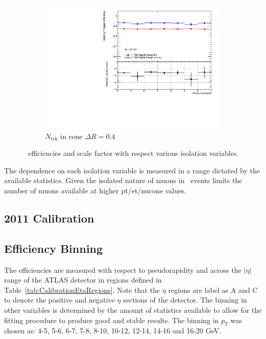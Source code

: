 \begin{figure}[phtb]
    \begin{subfigure}[b]{0.60\textwidth}
      \includegraphics[width=\textwidth]{PartCalibration2012/Plots/SFPlots/nucone40_smt.pdf}
      \caption{$N_{\textrm{trk}}$ in cone $\Delta R=0.4$} \label{fig:CalibrationIsoNucone40}
    \end{subfigure}
  \caption{\xsd\ efficiencies and scale factor with respect various isolation variables.} \label{fig:CalibrationIsoNucone}
\end{figure}

The dependence on each isolation variable is measured in a range dictated by the available statistics. Given the isolated nature of muons in \jpsi\ events limits the number of muons available at higher pt/et/nucone values.

\subsection{2011 Calibration}


\subsection{Efficiency Binning}

The efficiencies are measured with respect to pseudorapidity and across the $|\eta|$ range of the ATLAS detector in regions defined in Table~\ref{tab:CalibrationEtaRegions}. Note that the $\eta$ regions are label as A and C to denote the positive and negative $\eta$ sections of the detector. The binning in other variables is determined by the amount of statistics available to allow for the fitting procedure to produce good and stable results. The binning in $p_{T}$ was chosen as: 4-5, 5-6, 6-7, 7-8, 8-10, 10-12, 12-14, 14-16 and 16-20 GeV.  

